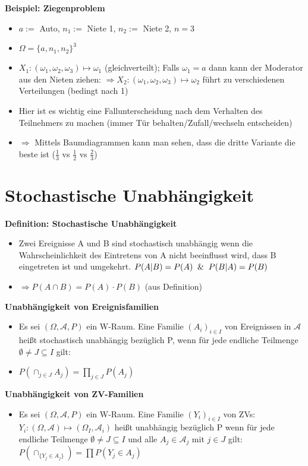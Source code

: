 \documentclass[a4paper,11pt]{scrartcl}
\begin{document}
\textbf{Beispiel: Ziegenproblem}

\begin{itemize}
    \item $a :=$ Auto, $n_1:=$ Niete 1, $n_2:=$ Niete 2, $n=$3
    \item $\Omega = \{a,n_1,n_2\}^3$
    \item $X_1: (\omega_1,\omega_2,\omega_3) \mapsto \omega_1$ (gleichverteilt); Falls $\omega_1 = a$ dann kann der Moderator aus den Nieten ziehen: $\Rightarrow X_2: (\omega_1,\omega_2,\omega_3) \mapsto \omega_2$ führt zu verschiedenen Verteilungen (bedingt nach 1)
    \item Hier ist es wichtig eine Fallunterscheidung nach dem Verhalten des Teilnehmers zu machen (immer Tür behalten/Zufall/wechseln entscheiden)
    \item $\Rightarrow$ Mittels Baumdiagrammen kann man sehen, dass die dritte Variante die beste ist ($\frac{1}{3}$ vs $\frac{1}{2}$ vs $\frac{2}{3}$)
\end{itemize}

\section{Stochastische Unabhängigkeit}

\textbf{Definition: Stochastische Unabhängigkeit}

\begin{itemize}
    \item Zwei Ereignisse A und B sind stochastisch unabhängig wenn die Wahrscheinlichkeit des Eintretens von A nicht beeinflusst wird, dass B eingetreten ist und umgekehrt. $P(A|B) = P(A) \And P(B|A) = P(B)$
    \item $\Rightarrow P(A \cap B) = P(A) \cdot P(B)$ (aus Definition)
\end{itemize}

\textbf{Unabhängigkeit von Ereignisfamilien}

\begin{itemize}
    \item Es sei $(\Omega, \mathcal{A}, P)$ ein W-Raum. Eine Familie $(A_i)_{i \in I}$ von Ereignissen in $\mathcal{A}$ heißt stochastisch unabhängig bezüglich P, wenn für jede endliche Teilmenge $\emptyset \neq J \subseteq  I$ gilt:
    \item $P(\cap_{j \in J} A_j) = \prod_{j \in J} P(A_j)$
\end{itemize}

\textbf{Unabhängigkeit von ZV-Familien}

\begin{itemize}
    \item Es sei $(\Omega, \mathcal{A}, P)$ ein W-Raum. Eine Familie $(Y_i)_{i \in I}$ von ZVs: $Y_i : (\Omega,\mathcal{A}) \mapsto (\Omega_I,\mathcal{A}_i)$ heißt unabhängig bezüglich P wenn für jede endliche Teilmenge $\emptyset \neq J \subseteq I$ und alle $A_j \in \mathcal{A}_j$ mit $j \in J$ gilt: $P(\cap_{\{Y_j \in A_j\}}) = \prod P(Y_j \in A_j)$
\end{itemize}
\end{document}
